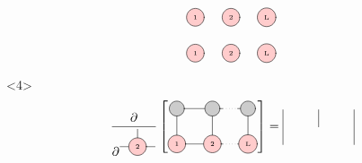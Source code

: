 \documentclass[aspectratio=169]{beamer}
\begin{document}
\begin{frame}
\begin{onlyenv}
\begin{equation}
\begin{tikzpicture}[baseline={([yshift=-.5ex]current bounding box.center)}]
      \node[draw, circle, line cap=round, fill=red!20] at (0,0) {\tiny 1};
      \node[draw, circle, line cap=round, fill=red!20] at (1,0) {\tiny 2};
      \node[draw, circle, line cap=round, fill=red!20] at (2,0) {\tiny L};
  
      \node[draw, circle, line cap=round, fill=red!20] at (0,-1) {\tiny 1};
      \node[draw, circle, line cap=round, fill=red!20] at (1,-1) {\tiny 2};
      \node[draw, circle, line cap=round, fill=red!20] at (2,-1) {\tiny L};    
    \end{tikzpicture} \thinspace 
  \end{equation}
  \end{onlyenv}
  \begin{onlyenv}<4>
    \begin{equation}\label{eq:gradient-1}
      \pderivative{\begin{tikzpicture}
        \draw[gray, thick] (0,0) -- (1,0);
        \draw[gray, thick] (0.5,0) -- (0.5,0.5);
        \node[draw, circle, line cap=round, fill=red!20] at (0.5,0) {\tiny 2};
      \end{tikzpicture}} \left[ \begin{tikzpicture}[baseline={([yshift=-.5ex]current bounding box.center)}]
        \draw[gray, thick] (0,0) -- (0,-1);
        \draw[gray, thick] (1,0) -- (1,-1);
        \draw[gray, thick] (2,0) -- (2,-1);
    
        \draw[gray, thick] (0,0) -- (1.3,0);
        \draw[gray, dotted] (1.3,0) -- (1.7,0);
        \draw[gray, thick] (1.7,0) -- (2.0,0);
    
        \draw[gray, thick] (0,-1) -- (1.3,-1);
        \draw[gray, dotted] (1.3,-1) -- (1.7,-1);
        \draw[gray, thick] (1.7,-1) -- (2.0,-1);
    
        \node[draw, circle, line cap=round, fill=black!20, minimum size=12] at (0,0) {  };
        \node[draw, circle, line cap=round, fill=black!20, minimum size=12] at (1,0) {  };
        \node[draw, circle, line cap=round, fill=black!20, minimum size=12] at (2,0) {  };
    
        \node[draw, circle, line cap=round, fill=red!20] at (0,-1) {\tiny 1};
        \node[draw, circle, line cap=round, fill=red!20] at (1,-1) {\tiny 2};
        \node[draw, circle, line cap=round, fill=red!20] at (2,-1) {\tiny L};
      \end{tikzpicture} \right] = 
      \begin{tikzpicture}[baseline={([yshift=-.5ex]current bounding box.center)}]
        \draw[gray, thick] (0,0) -- (0,-1);
        \draw[gray, thick] (1,0) -- (1,-0.5);
        \draw[gray, thick] (2,0) -- (2,-1);
    

\end{tikzpicture}
\end{equation}
\end{onlyenv}
\end{frame}
\end{document}
